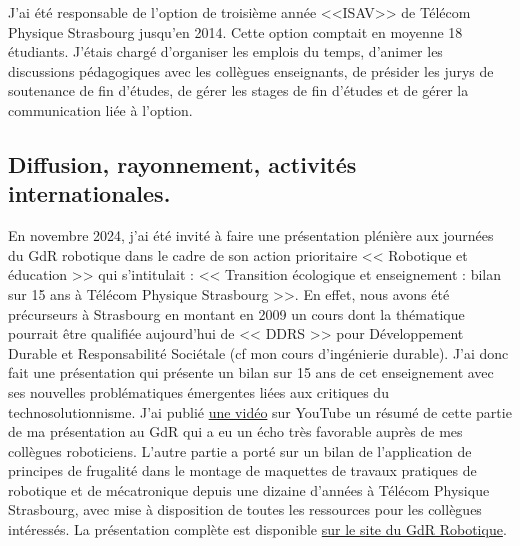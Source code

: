 \documentclass[a4paper,12pt]{article}
\begin{document}
J'ai été responsable de l'option de troisième année <<ISAV>> de Télécom Physique Strasbourg jusqu'en 2014. Cette option comptait en moyenne 18 étudiants. J'étais chargé d'organiser les emplois du temps, d'animer les discussions pédagogiques avec les collègues enseignants, de présider les jurys de soutenance de fin d'études, de gérer les stages de fin d'études et de gérer la communication liée à l'option.

\subsection{Diffusion, rayonnement, activités internationales.}
\label{sec:ens_diffusion_rayonnement}


En novembre 2024, j'ai été invité à faire une présentation plénière aux journées du GdR robotique dans le cadre de son action prioritaire << Robotique et éducation >> qui s'intitulait : << Transition écologique et enseignement : bilan sur 15 ans à Télécom Physique Strasbourg >>. En effet, nous avons été précurseurs à Strasbourg en montant en 2009 un cours dont la thématique pourrait être qualifiée aujourd'hui de << DDRS >> pour Développement Durable et Responsabilité Sociétale (cf mon cours d'ingénierie durable). J'ai donc fait une présentation qui présente un bilan sur 15 ans de cet enseignement avec ses nouvelles problématiques émergentes liées aux critiques du technosolutionnisme. J'ai publié \href{https://youtu.be/gVKNGADG_mw}{une vidéo} sur YouTube un résumé de cette partie de ma présentation au GdR qui a eu un écho très favorable auprès de mes collègues roboticiens. L'autre partie a porté sur un bilan de l'application de principes de frugalité dans le montage de maquettes de travaux pratiques de robotique et de mécatronique depuis une dizaine d'années à Télécom Physique Strasbourg, avec mise à disposition de toutes les ressources pour les collègues intéressés. La présentation complète est disponible \href{https://www.gdr-robotique.org/rapports/?id=c93716b1cd6309bde1a84101b5ea847d}{sur le site du GdR Robotique}.
\end{document}
